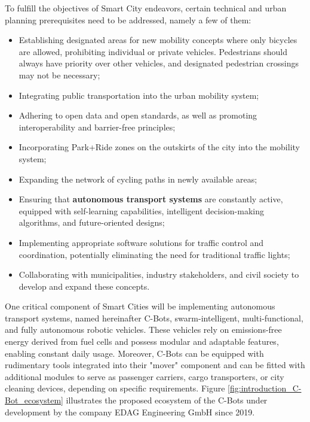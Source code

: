 To fulfill the objectives of Smart City endeavors, certain technical and urban planning prerequisites need to be addressed, namely a few of them:

\begin{itemize}
    \item Establishing designated areas for new mobility concepts where only bicycles are allowed, prohibiting individual or private vehicles. Pedestrians should always have priority over other vehicles, and designated pedestrian crossings may not be necessary;
    \item Integrating public transportation into the urban mobility system;
    \item Adhering to open data and open standards, as well as promoting interoperability and barrier-free principles;
    \item Incorporating Park+Ride zones on the outskirts of the city into the mobility system;
    \item Expanding the network of cycling paths in newly available areas;
    \item Ensuring that \textbf{autonomous transport systems} are constantly active, equipped with self-learning capabilities, intelligent decision-making algorithms, and future-oriented designs;
    \item Implementing appropriate software solutions for traffic control and coordination, potentially eliminating the need for traditional traffic lights;
    \item Collaborating with municipalities, industry stakeholders, and civil society to develop and expand these concepts.
\end{itemize}

One critical component of Smart Cities will be implementing autonomous transport systems, named hereinafter C-Bots, swarm-intelligent, multi-functional, and fully autonomous robotic vehicles. These vehicles rely on emissions-free energy derived from fuel cells and possess modular and adaptable features, enabling constant daily usage. Moreover, C-Bots can be equipped with rudimentary tools integrated into their "mover" component and can be fitted with additional modules to serve as passenger carriers, cargo transporters, or city cleaning devices, depending on specific requirements. Figure \ref{fig:introduction_C-Bot_ecosystem} illustrates the proposed ecosystem of the C-Bots under development by the company EDAG Engineering GmbH since 2019.

